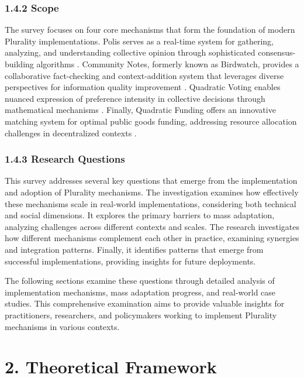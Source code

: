 \hypertarget{scope}{%
\subsubsection{1.4.2 Scope}\label{scope}}

The survey focuses on four core mechanisms that form the foundation of modern Plurality implementations. Polis serves as a real-time system for gathering, analyzing, and understanding collective opinion through sophisticated consensus-building algorithms \citep{polis2024}. Community Notes, formerly known as Birdwatch, provides a collaborative fact-checking and context-addition system that leverages diverse perspectives for information quality improvement \citep{communitynotes2024}. Quadratic Voting enables nuanced expression of preference intensity in collective decisions through mathematical mechanisms \citep{coloradoqv2019}. Finally, Quadratic Funding offers an innovative matching system for optimal public goods funding, addressing resource allocation challenges in decentralized contexts \citep{buterin2019flexible}.

\hypertarget{research-questions}{%
\subsubsection{1.4.3 Research Questions}\label{research-questions}}

This survey addresses several key questions that emerge from the implementation and adoption of Plurality mechanisms. The investigation examines how effectively these mechanisms scale in real-world implementations, considering both technical and social dimensions. It explores the primary barriers to mass adaptation, analyzing challenges across different contexts and scales. The research investigates how different mechanisms complement each other in practice, examining synergies and integration patterns. Finally, it identifies patterns that emerge from successful implementations, providing insights for future deployments.

The following sections examine these questions through detailed analysis of implementation mechanisms, mass adaptation progress, and real-world case studies. This comprehensive examination aims to provide valuable insights for practitioners, researchers, and policymakers working to implement Plurality mechanisms in various contexts.

\hypertarget{theoretical-framework}{%
\section{2. Theoretical Framework}\label{theoretical-framework}}

